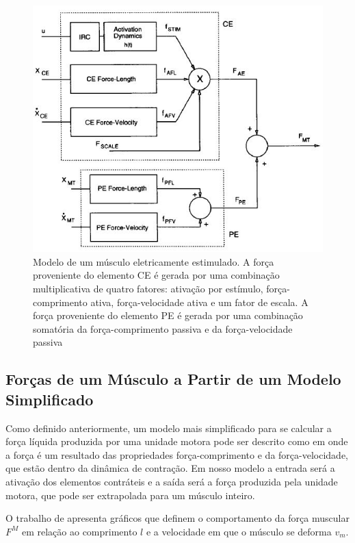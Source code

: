 \begin{figure}[H]
\centering
\includegraphics[width = 1\textwidth]{img/Durfee1994_Modelo.JPG}
\caption[Exemplo de Modelo Simplificado para Obter as Forças dos Músculos]{Modelo de um músculo eletricamente estimulado. A força proveniente do elemento CE é gerada por uma combinação multiplicativa de quatro fatores: ativação por estímulo, força-comprimento ativa, força-velocidade ativa e um fator de escala. A força proveniente do elemento PE é gerada por uma combinação somatória da força-comprimento passiva e da força-velocidade passiva 
\cite{durfee1994estimation}}
\label{modelo_durfee}
\end{figure}


\subsection{Forças de um Músculo a Partir de um Modelo Simplificado}
Como definido anteriormente, um modelo mais simplificado para se calcular a força líquida produzida por uma unidade motora pode ser descrito como em \cite{zajac1989muscle} onde a força é um resultado das propriedades força-comprimento e da força-velocidade, que estão dentro da dinâmica de contração. Em nosso modelo a entrada será a ativação dos elementos contráteis e a saída será a força produzida pela unidade motora, que pode ser extrapolada para um músculo inteiro.

O trabalho de \cite{zajac1989muscle} apresenta gráficos que definem o comportamento da força muscular $F^M$ em relação ao comprimento $l$ e a velocidade em que o músculo se deforma $v_m$. 

